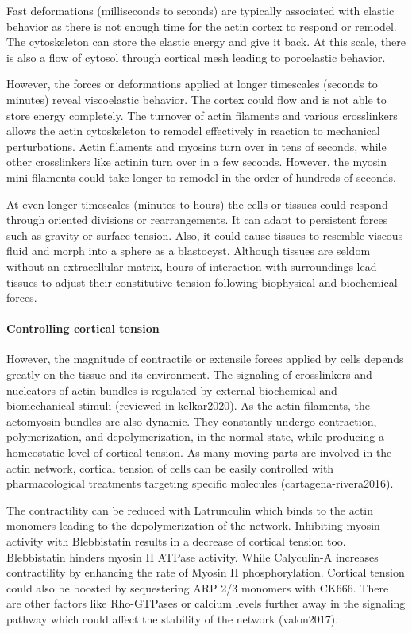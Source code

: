 \documentclass[
]{article}
\begin{document}
Fast deformations (milliseconds to seconds) are typically associated
with elastic behavior as there is not enough time for the actin cortex
to respond or remodel. The cytoskeleton can store the elastic energy and
give it back. At this scale, there is also a flow of cytosol through
cortical mesh leading to poroelastic behavior.

However, the forces or deformations applied at longer timescales
(seconds to minutes) reveal viscoelastic behavior. The cortex could flow
and is not able to store energy completely. The turnover of actin
filaments and various crosslinkers allows the actin cytoskeleton to
remodel effectively in reaction to mechanical perturbations. Actin
filaments and myosins turn over in tens of seconds, while other
crosslinkers like actinin turn over in a few seconds. However, the
myosin mini filaments could take longer to remodel in the order of
hundreds of seconds.

At even longer timescales (minutes to hours) the cells or tissues could
respond through oriented divisions or rearrangements. It can adapt to
persistent forces such as gravity or surface tension. Also, it could
cause tissues to resemble viscous fluid and morph into a sphere as a
blastocyst. Although tissues are seldom without an extracellular matrix,
hours of interaction with surroundings lead tissues to adjust their
constitutive tension following biophysical and biochemical forces.

\hypertarget{controlling-cortical-tension}{%
\paragraph{Controlling cortical
tension}\label{controlling-cortical-tension}}

However, the magnitude of contractile or extensile forces applied by
cells depends greatly on the tissue and its environment. The signaling
of crosslinkers and nucleators of actin bundles is regulated by external
biochemical and biomechanical stimuli (reviewed in kelkar2020). As the
actin filaments, the actomyosin bundles are also dynamic. They
constantly undergo contraction, polymerization, and depolymerization, in
the normal state, while producing a homeostatic level of cortical
tension. As many moving parts are involved in the actin network,
cortical tension of cells can be easily controlled with pharmacological
treatments targeting specific molecules (cartagena-rivera2016).

The contractility can be reduced with Latrunculin which binds to the
actin monomers leading to the depolymerization of the network.
Inhibiting myosin activity with Blebbistatin results in a decrease of
cortical tension too. Blebbistatin hinders myosin II ATPase activity.
While Calyculin-A increases contractility by enhancing the rate of
Myosin II phosphorylation. Cortical tension could also be boosted by
sequestering ARP 2/3 monomers with CK666. There are other factors like
Rho-GTPases or calcium levels further away in the signaling pathway
which could affect the stability of the network (valon2017).
\end{document}
